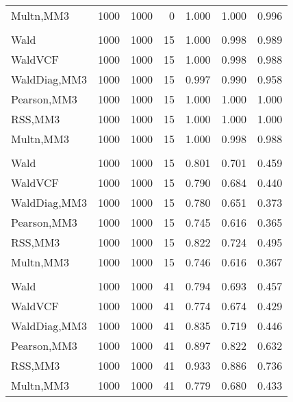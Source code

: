 \documentclass[
]{article}
\begin{document}
\begin{table}[H]
{\begin{tabular}[t]{lrrrrrr}
\hspace{1em}Multn,MM3 & 1000 & 1000 & 0 & 1.000 & 1.000 & 0.996\\
\addlinespace[0.3em]
\multicolumn{7}{l}{\textbf{1F 15V}}\\
\hspace{1em}Wald & 1000 & 1000 & 15 & 1.000 & 0.998 & 0.989\\
\hspace{1em}WaldVCF & 1000 & 1000 & 15 & 1.000 & 0.998 & 0.988\\
\hspace{1em}WaldDiag,MM3 & 1000 & 1000 & 15 & 0.997 & 0.990 & 0.958\\
\hspace{1em}Pearson,MM3 & 1000 & 1000 & 15 & 1.000 & 1.000 & 1.000\\
\hspace{1em}RSS,MM3 & 1000 & 1000 & 15 & 1.000 & 1.000 & 1.000\\
\hspace{1em}Multn,MM3 & 1000 & 1000 & 15 & 1.000 & 0.998 & 0.988\\
\addlinespace[0.3em]
\multicolumn{7}{l}{\textbf{2F 10V}}\\
\hspace{1em}Wald & 1000 & 1000 & 15 & 0.801 & 0.701 & 0.459\\
\hspace{1em}WaldVCF & 1000 & 1000 & 15 & 0.790 & 0.684 & 0.440\\
\hspace{1em}WaldDiag,MM3 & 1000 & 1000 & 15 & 0.780 & 0.651 & 0.373\\
\hspace{1em}Pearson,MM3 & 1000 & 1000 & 15 & 0.745 & 0.616 & 0.365\\
\hspace{1em}RSS,MM3 & 1000 & 1000 & 15 & 0.822 & 0.724 & 0.495\\
\hspace{1em}Multn,MM3 & 1000 & 1000 & 15 & 0.746 & 0.616 & 0.367\\
\addlinespace[0.3em]
\multicolumn{7}{l}{\textbf{3F 15V}}\\
\hspace{1em}Wald & 1000 & 1000 & 41 & 0.794 & 0.693 & 0.457\\
\hspace{1em}WaldVCF & 1000 & 1000 & 41 & 0.774 & 0.674 & 0.429\\
\hspace{1em}WaldDiag,MM3 & 1000 & 1000 & 41 & 0.835 & 0.719 & 0.446\\
\hspace{1em}Pearson,MM3 & 1000 & 1000 & 41 & 0.897 & 0.822 & 0.632\\
\hspace{1em}RSS,MM3 & 1000 & 1000 & 41 & 0.933 & 0.886 & 0.736\\
\hspace{1em}Multn,MM3 & 1000 & 1000 & 41 & 0.779 & 0.680 & 0.433\\
\bottomrule
\end{tabular}}
\endgroup{}
\end{table}
\end{document}
